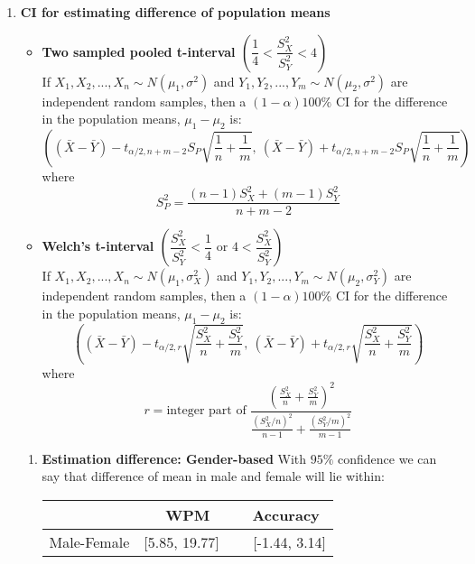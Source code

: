 \documentclass[12pt,a4paper]{report}
\begin{document}
\begin{enumerate}[label=\textbf{\arabic*})]
    \item \textbf{\Large{CI for estimating difference of population means}}
    \begin{itemize}
        \item \textbf{Two sampled pooled t-interval $\left(\dfrac{1}{4}<\dfrac{S_X^2}{S_Y^2}<4\right)$}\\
        If $X_1,X_2,...,X_n \sim N(\mu_1,\sigma^2)$ and $Y_1,Y_2,...,Y_m \sim N(\mu_2,\sigma^2)$ are independent random samples, then a $(1 - \alpha)100\%$ CI for the difference in the population means, $\mu_1-\mu_2$ is:
        \[\left((\bar{X}-\bar{Y})-t_{\alpha/2,n+m-2} S_P\sqrt{\frac{1}{n}+\frac{1}{m}},\  (\bar{X}-\bar{Y})+t_{\alpha/2,n+m-2} S_P\sqrt{\frac{1}{n}+\frac{1}{m}}\right)
        \]
        where 
        \[S_P^2 = \dfrac{(n-1)S_X^2+(m-1)S_Y^2}{n+m-2}
        \]
        \item \textbf{Welch's t-interval $\left(\dfrac{S_X^2}{S_Y^2}<\dfrac{1}{4} \text{\ or\ } 4<\dfrac{S_X^2}{S_Y^2}\right)$}\\
        If $X_1,X_2,...,X_n \sim N(\mu_1,\sigma_X^2)$ and $Y_1,Y_2,...,Y_m \sim N(\mu_2,\sigma_Y^2)$ are independent random samples, then a $(1 - \alpha)100\%$ CI for the difference in the population means, $\mu_1-\mu_2$ is:
        \[\left((\bar{X}-\bar{Y})-t_{\alpha/2,r}\sqrt{\frac{S_X^2}{n}+\frac{S_Y^2}{m}}, \ (\bar{X}-\bar{Y})+t_{\alpha/2,r}\sqrt{\frac{S_X^2}{n}+\frac{S_Y^2}{m}}\right)
        \]
        where 
        \[r = \text{integer part of \ } \dfrac{\left(\frac{S_X^2}{n}+\frac{S_Y^2}{m}\right)^2}{\frac{(S_X^2/n)^2}{n-1} + \frac{(S_Y^2/m)^2}{m-1}}
        \]
    \end{itemize}
    \vspace{1mm}
    \begin{enumerate}
        \item \textbf{Estimation difference: Gender-based}
        With $95\%$ confidence we can say that difference of mean in male and female will lie within:
    \begin{center}
    \begin{tabular}{ |c|c|c|}
      \hline
        & WPM & Accuracy \\
      \hline
      Male-Female & [5.85, 19.77] \ & \ [-1.44, 3.14] \\
      \hline
    \end{tabular}
    \end{center}
    \vspace{1.5mm}
    

\end{enumerate}
\end{enumerate}
\end{document}
